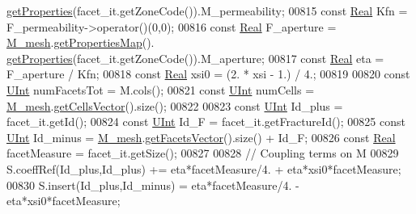 \begin{DoxyCode}
      \hyperlink{classFVCode3D_1_1PropertiesMap_ace888d15c9a4ab13d5e217a3a565604c}{getProperties}(facet\_it.getZoneCode()).M\_permeability;
00815         \textcolor{keyword}{const} \hyperlink{namespaceFVCode3D_a40c1f5588a248569d80aa5f867080e83}{Real} Kfn = F\_permeability->operator()(0,0);
00816         \textcolor{keyword}{const} \hyperlink{namespaceFVCode3D_a40c1f5588a248569d80aa5f867080e83}{Real} F\_aperture = \hyperlink{classFVCode3D_1_1global__Operator_a027911d0f801f6f19a3006329ec30a7f}{M\_mesh}.\hyperlink{classFVCode3D_1_1Rigid__Mesh_ab6e52fa6193e5db83fe7ccbb1c3737e8}{getPropertiesMap}().
      \hyperlink{classFVCode3D_1_1PropertiesMap_ace888d15c9a4ab13d5e217a3a565604c}{getProperties}(facet\_it.getZoneCode()).M\_aperture;
00817                 \textcolor{keyword}{const} \hyperlink{namespaceFVCode3D_a40c1f5588a248569d80aa5f867080e83}{Real} eta = F\_aperture / Kfn;
00818                 \textcolor{keyword}{const} \hyperlink{namespaceFVCode3D_a40c1f5588a248569d80aa5f867080e83}{Real} xsi0     =  (2. * xsi - 1.) / 4.;
00819                 
00820                 \textcolor{keyword}{const} \hyperlink{namespaceFVCode3D_a4bf7e328c75d0fd504050d040ebe9eda}{UInt} numFacetsTot = M.cols();
00821                 \textcolor{keyword}{const} \hyperlink{namespaceFVCode3D_a4bf7e328c75d0fd504050d040ebe9eda}{UInt} numCells     = \hyperlink{classFVCode3D_1_1global__Operator_a027911d0f801f6f19a3006329ec30a7f}{M\_mesh}.\hyperlink{classFVCode3D_1_1Rigid__Mesh_afefb62f2c37317402b495e2369ed495b}{getCellsVector}().size();
00822                 
00823                 \textcolor{keyword}{const} \hyperlink{namespaceFVCode3D_a4bf7e328c75d0fd504050d040ebe9eda}{UInt} Id\_plus         = facet\_it.getId();
00824                 \textcolor{keyword}{const} \hyperlink{namespaceFVCode3D_a4bf7e328c75d0fd504050d040ebe9eda}{UInt} Id\_F            = facet\_it.getFractureId();
00825                 \textcolor{keyword}{const} \hyperlink{namespaceFVCode3D_a4bf7e328c75d0fd504050d040ebe9eda}{UInt} Id\_minus        = \hyperlink{classFVCode3D_1_1global__Operator_a027911d0f801f6f19a3006329ec30a7f}{M\_mesh}.\hyperlink{classFVCode3D_1_1Rigid__Mesh_a6d3cdd4ef8a5225599953179d5302636}{getFacetsVector}().size() + 
      Id\_F;
00826                 \textcolor{keyword}{const} \hyperlink{namespaceFVCode3D_a40c1f5588a248569d80aa5f867080e83}{Real} facetMeasure    = facet\_it.getSize();
00827                 
00828                 \textcolor{comment}{// Coupling terms on M}
00829                 S.coeffRef(Id\_plus,Id\_plus)    +=   eta*facetMeasure/4. + eta*xsi0*facetMeasure;
00830                 S.insert(Id\_plus,Id\_minus)      =   eta*facetMeasure/4. - eta*xsi0*facetMeasure;

\end{DoxyCode}

